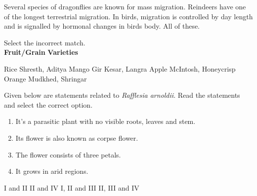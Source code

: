 \begin{questions}
    \begin{choices}
        \choice Several species of dragonflies are known for mass migration.
        \choice Reindeers have one of the longest terrestrial migration.
        \choice In birds, migration is controlled by day length and is signalled by hormonal changes in birds body.
        \CorrectChoice All of these.
    \end{choices}

    \question Select the incorrect match.\\
    \textbf{Fruit/Grain} \quad \textemdash \quad \textbf{Varieties}

    \begin{randomizechoices}
        \CorrectChoice Rice \quad \textemdash \quad Shresth, Aditya
        \choice Mango \quad \textemdash \quad Gir Kesar, Langra
        \choice Apple \quad \textemdash \quad McIntosh, Honeycrisp
        \choice Orange \quad \textemdash \quad Mudkhed, Shringar
    \end{randomizechoices}

    \question Given below are statements related to \emph{Rafflesia arnoldii}. Read the statements and select the correct option.
    \begin{enumerate}[align=left,label=\Roman*.]
        \item It's a parasitic plant with no visible roots, leaves and stem.
        \item Its flower is also known as corpse flower.
        \item The flower consists of three petals.
        \item It grows in arid regions.
    \end{enumerate}
    \begin{randomizeoneparchoices}
        \CorrectChoice I and II
        \choice II and IV
        \choice I, II and III
        \choice II, III and IV
    \end{randomizeoneparchoices}

\end{questions}

